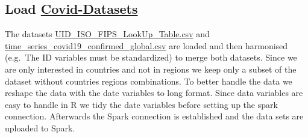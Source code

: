 \documentclass[]{article}
\begin{document}
\hypertarget{load-covid-datasets}{%
\subsection{\texorpdfstring{Load
\href{https://github.com/CSSEGISandData/COVID-19/tree/master/csse_covid_19_data}{Covid-Datasets}}{Load Covid-Datasets}}\label{load-covid-datasets}}

The datasets
\href{https://raw.githubusercontent.com/CSSEGISandData/COVID-19/master/csse_covid_19_data/UID_ISO_FIPS_LookUp_Table.csv}{UID\_ISO\_FIPS\_LookUp\_Table.csv}
and
\href{https://raw.githubusercontent.com/CSSEGISandData/COVID-19/master/csse_covid_19_data/csse_covid_19_time_series/time_series_covid19_confirmed_global.csv}{time\_series\_covid19\_confirmed\_global.csv}
are loaded and then harmonised (e.g.~The ID variables must be
standardized) to merge both datasets. Since we are only interested in
countries and not in regions we keep only a subset of the dataset
without countries regions combinations. To better handle the data we
reshape the data with the date variables to long format. Since data
variables are easy to handle in R we tidy the date variables before
setting up the spark connection. Afterwards the Spark connection is
established and the data sets are uploaded to Spark.
\end{document}

